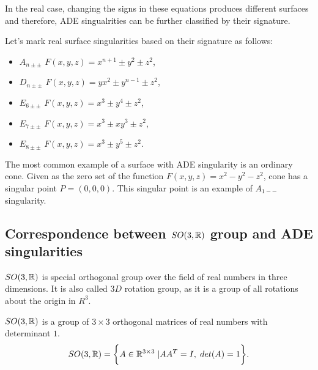 In the real case, changing the signs in these equations produces different
surfaces and therefore, ADE singualrities can be further classified by their
signature.

\begin{definition}
    Let's mark real surface singularities based on their signature as follows:
    \begin{itemize}
        \item $A_{n\pm\pm}$ \hspace{5mm} $F(x,y,z)=x^{n+1}\pm y^2\pm z^2$,
              
        \item $D_{n\pm\pm}$ \hspace{5mm} $F(x,y,z)=yx^2\pm y^{n-1}\pm z^2$,
        
        \item $E_{6\pm\pm}$ \hspace{5mm} $F(x,y,z)=x^3\pm y^4\pm z^2$,
        
        \item $E_{7\pm\pm}$ \hspace{5mm} $F(x,y,z)=x^3\pm xy^3\pm z^2$,
        
        \item $E_{8\pm\pm}$ \hspace{5mm} $F(x,y,z)=x^3\pm y^5\pm z^2$.
        \end{itemize}
\end{definition}

The most common example of a surface with ADE singularity is an ordinary cone.
Given as the zero set of the function $F(x, y, z)=x^2-y^2-z^2$, cone has
a singular point $P=(0, 0, 0)$. This singular point is an example of $A_{1--}$
singularity.

\subsection*{Correspondence between $SO(3,\mathbb{R})$ group and ADE singularities}
\label{subs2.2.2}
$SO(3, \mathbb{R})$ is special orthogonal group over the field of real numbers 
in three dimensions. It is also called $3D$ rotation group, as it is a group
of all rotations about the origin in $R^3$.
\begin{definition}
    $SO(3, \mathbb{R})$ is a group of $3\times3$ orthogonal matrices
    of real numbers with determinant $1$.
    $$SO(3, \mathbb{R}) = \bigg\{A\in\mathbb{R}^{3\times3} \hspace{1mm} | AA^T=I ,\hspace{1mm} det(A)=1\bigg\}.$$
\end{definition}

